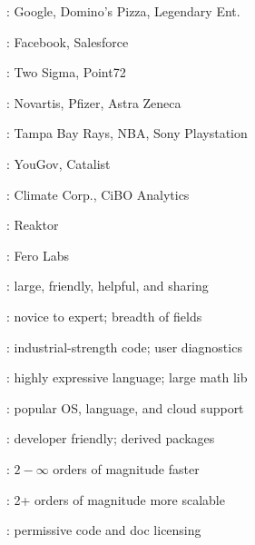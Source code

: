 \documentclass[9pt]{report}
\begin{document}
\vspace*{3pt}
\begin{subitemize}
\item {}: Google, Domino's Pizza, Legendary Ent.
\item {}: Facebook, Salesforce
\item {}: Two Sigma, Point72
\item {}: Novartis, Pfizer, Astra Zeneca
\item {}: Tampa Bay Rays, NBA, Sony Playstation
\item {}: YouGov, Catalist
\item {}: Climate Corp., CiBO Analytics
\item {}: Reaktor
\item {}: Fero Labs
\end{subitemize}


\vspace*{3pt}
\begin{subitemize}
\item {}: large, friendly, helpful, and sharing
\item {}:  novice to expert; breadth of fields
\item {}:  industrial-strength code; user diagnostics
\item {}:  highly expressive language;  large math lib
\item {}: popular OS, language, and cloud support
\item {}: developer friendly; derived packages
\item {}:  $2-\infty$ orders of magnitude faster
\item {}:  2+ orders of magnitude more scalable
\item {}: permissive code and doc licensing
\end{subitemize}


\end{document}

